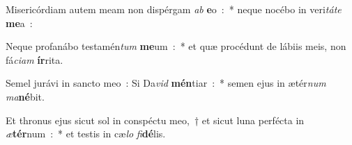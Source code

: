 \item Misericórdiam autem meam non dispérgam \emph{ab} \textbf{e}o~:~* neque nocébo in veri\emph{tá}\emph{te} \textbf{me}a~:
\item Neque profanábo testamén\emph{tum} \textbf{me}um~:~* et quæ procédunt de lábiis meis, non fá\emph{ci}\emph{am} \textbf{ír}rita.
\item Semel jurávi in sancto meo~: Si Da\emph{vid} \textbf{mén}tiar~:~* semen ejus in ætér\emph{num} \emph{ma}\textbf{né}bit.
\item Et thronus ejus sicut sol in conspéctu meo,~† et sicut luna perfécta in \emph{æ}\textbf{tér}num~:~* et testis in cæ\emph{lo} \emph{fi}\textbf{dé}lis.
